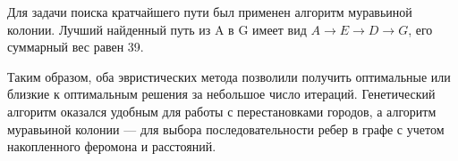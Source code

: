 \documentclass[12pt,a4paper]{article}
\begin{document}
Для задачи поиска кратчайшего пути был применен алгоритм муравьиной колонии. Лучший найденный путь из A в G имеет вид $A \rightarrow E \rightarrow D \rightarrow G$, его суммарный вес равен 39.

Таким образом, оба эвристических метода позволили получить оптимальные или близкие к оптимальным решения за небольшое число итераций. Генетический алгоритм оказался удобным для работы с перестановками городов, а алгоритм муравьиной колонии --- для выбора последовательности ребер в графе с учетом накопленного феромона и расстояний.
\end{document}
